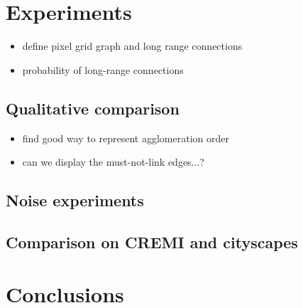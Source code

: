 \documentclass[10pt,twocolumn,letterpaper]{article}
\begin{document}
\section{Experiments}
\begin{itemize}
\item define pixel grid graph and long range connections
\item probability of long-range connections
\end{itemize}





\subsection{Qualitative comparison}
\begin{itemize}
\item find good way to represent agglomeration order
\item can we display the must-not-link edges...?
\end{itemize}
\subsection{Noise experiments}

\subsection{Comparison on CREMI and cityscapes}

\section{Conclusions}
\end{document}
